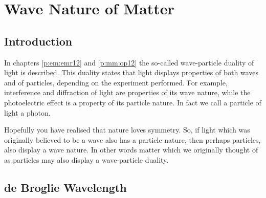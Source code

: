 \chapter{Wave Nature of Matter}
\label{p:wsl:wnm12}

\section{Introduction}

In chapters \ref{p:em:emr12} and \ref{p:mm:op12} the so-called wave-particle duality of light is described. This duality states that light displays properties of both waves and of particles, depending on the experiment performed. For example, interference and diffraction of light are properties of its  wave nature, while the photoelectric effect is a property of its particle nature. In fact we call a particle of light a photon.

Hopefully you have realised that nature loves symmetry. So, if light which was originally believed to be a wave also has a particle nature, then perhaps particles, also display a wave nature. In other words matter which we originally thought of as particles may also display a wave-particle duality.
\section{de Broglie Wavelength}

